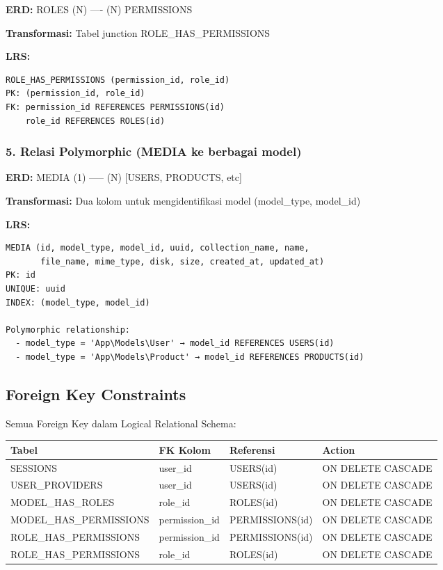 \documentclass[12pt,a4paper]{article}
\begin{document}
\noindent\textbf{ERD:} ROLES (N) ---- (N) PERMISSIONS

\noindent\textbf{Transformasi:} Tabel junction ROLE\_HAS\_PERMISSIONS

\noindent\textbf{LRS:}
\begin{verbatim}
ROLE_HAS_PERMISSIONS (permission_id, role_id)
PK: (permission_id, role_id)
FK: permission_id REFERENCES PERMISSIONS(id)
    role_id REFERENCES ROLES(id)
\end{verbatim}

\subsubsection{5. Relasi Polymorphic (MEDIA ke berbagai model)}

\noindent\textbf{ERD:} MEDIA (1) ----- (N) [USERS, PRODUCTS, etc]

\noindent\textbf{Transformasi:} Dua kolom untuk mengidentifikasi model (model\_type, model\_id)

\noindent\textbf{LRS:}
\begin{verbatim}
MEDIA (id, model_type, model_id, uuid, collection_name, name, 
       file_name, mime_type, disk, size, created_at, updated_at)
PK: id
UNIQUE: uuid
INDEX: (model_type, model_id)

Polymorphic relationship:
  - model_type = 'App\Models\User' → model_id REFERENCES USERS(id)
  - model_type = 'App\Models\Product' → model_id REFERENCES PRODUCTS(id)
\end{verbatim}

\subsection{Foreign Key Constraints}

Semua Foreign Key dalam Logical Relational Schema:

\begin{table}[h]
\centering
\begin{tabular}{|l|l|l|l|}
\hline
\textbf{Tabel} & \textbf{FK Kolom} & \textbf{Referensi} & \textbf{Action} \\
\hline
SESSIONS & user\_id & USERS(id) & ON DELETE CASCADE \\
\hline
USER\_PROVIDERS & user\_id & USERS(id) & ON DELETE CASCADE \\
\hline
MODEL\_HAS\_ROLES & role\_id & ROLES(id) & ON DELETE CASCADE \\
\hline
MODEL\_HAS\_PERMISSIONS & permission\_id & PERMISSIONS(id) & ON DELETE CASCADE \\
\hline
ROLE\_HAS\_PERMISSIONS & permission\_id & PERMISSIONS(id) & ON DELETE CASCADE \\
\hline
ROLE\_HAS\_PERMISSIONS & role\_id & ROLES(id) & ON DELETE CASCADE \\
\hline
\end{tabular}
\end{table}
\end{document}
